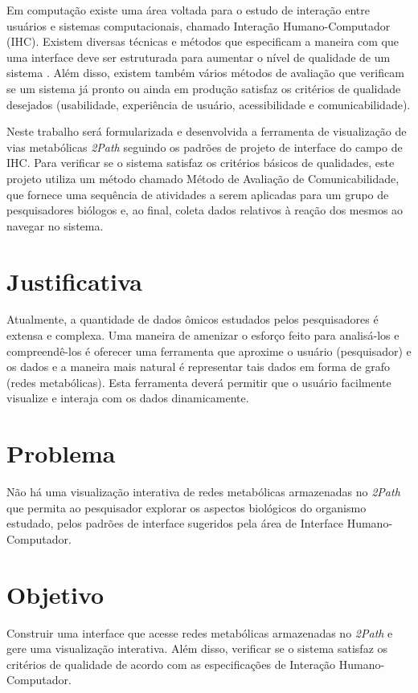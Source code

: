 \indent Em computação existe uma área voltada para o estudo de interação entre usuários e sistemas computacionais, chamado Interação Humano-Computador (IHC). Existem diversas técnicas e métodos que especificam a maneira com que uma interface deve ser estruturada para aumentar o nível de qualidade de um sistema \cite{IHCbook}. Além disso, existem também vários métodos de avaliação que verificam se um sistema já pronto ou ainda em produção satisfaz os critérios de qualidade \cite{IHCbook} desejados (usabilidade, experiência de usuário, acessibilidade e comunicabilidade).

\indent Neste trabalho será formularizada e desenvolvida a ferramenta de visualização de vias metabólicas \textit{2Path} seguindo os padrões de projeto de interface do campo de IHC. Para verificar se o sistema satisfaz os critérios básicos de qualidades, este projeto utiliza um método chamado Método de Avaliação de Comunicabilidade, que fornece uma sequência de atividades a serem aplicadas para um grupo de pesquisadores biólogos e, ao final, coleta dados relativos à reação dos mesmos ao navegar no sistema.


\section{Justificativa}
\indent Atualmente, a quantidade de dados ômicos estudados pelos pesquisadores é extensa e complexa. Uma maneira de amenizar o esforço feito para analisá-los e compreendê-los é oferecer uma ferramenta que aproxime o usuário (pesquisador) e os dados e a maneira mais natural é representar tais dados em forma de grafo (redes metabólicas). Esta ferramenta deverá permitir que o usuário facilmente visualize e interaja com os dados dinamicamente.

\section{Problema}
\indent Não há uma visualização interativa de redes metabólicas armazenadas no \textit{2Path} que permita ao pesquisador explorar os aspectos biológicos do organismo estudado, pelos padrões de interface sugeridos pela área de Interface Humano-Computador.

\section{Objetivo}
\indent Construir uma interface que acesse redes metabólicas armazenadas no \textit{2Path} e gere uma visualização interativa. Além disso, verificar se o sistema satisfaz os critérios de qualidade de acordo com as especificações de Interação Humano-Computador.

